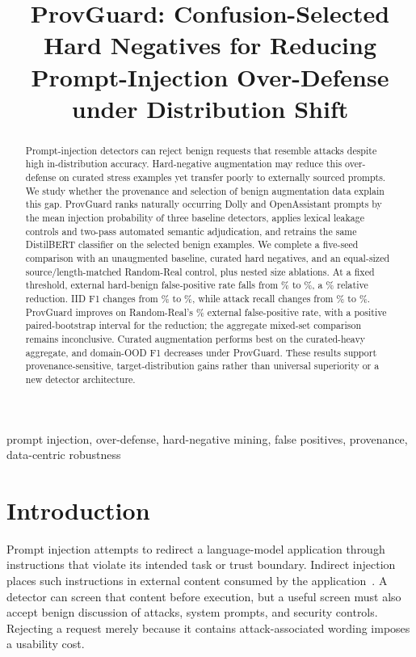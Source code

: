\documentclass[conference]{IEEEtran}
\title{ProvGuard: Confusion-Selected Hard Negatives for Reducing Prompt-Injection Over-Defense under Distribution Shift}
\author{\IEEEauthorblockN{Anonymous Authors}}
\begin{document}
\maketitle

\begin{abstract}
Prompt-injection detectors can reject benign requests that resemble attacks despite high in-distribution accuracy. Hard-negative augmentation may reduce this over-defense on curated stress examples yet transfer poorly to externally sourced prompts. We study whether the provenance and selection of benign augmentation data explain this gap. ProvGuard ranks naturally occurring Dolly and OpenAssistant prompts by the mean injection probability of three baseline detectors, applies lexical leakage controls and two-pass automated semantic adjudication, and retrains the same DistilBERT classifier on the selected benign examples. We complete a five-seed comparison with an unaugmented baseline, curated hard negatives, and an equal-sized source/length-matched Random-Real control, plus nested size ablations. At a fixed threshold, external hard-benign false-positive rate falls from \BaseExtPct\% to \PGExtPct\%, a \BaseExtDropRel\% relative reduction. IID F1 changes from \BaseIIDPct\% to \PGIIDPct\%, while attack recall changes from \BaseRecPct\% to \PGRecPct\%. ProvGuard improves on Random-Real's \RandExtPct\% external false-positive rate, with a positive paired-bootstrap interval for the reduction; the aggregate mixed-set comparison remains inconclusive. Curated augmentation performs best on the curated-heavy aggregate, and domain-OOD F1 decreases under ProvGuard. These results support provenance-sensitive, target-distribution gains rather than universal superiority or a new detector architecture.
\end{abstract}
\begin{IEEEkeywords}
prompt injection, over-defense, hard-negative mining, false positives, provenance, data-centric robustness
\end{IEEEkeywords}

\section{Introduction}
Prompt injection attempts to redirect a language-model application through instructions that violate its intended task or trust boundary. Indirect injection places such instructions in external content consumed by the application~\cite{greshake}. A detector can screen that content before execution, but a useful screen must also accept benign discussion of attacks, system prompts, and security controls. Rejecting a request merely because it contains attack-associated wording imposes a usability cost.
\end{document}
